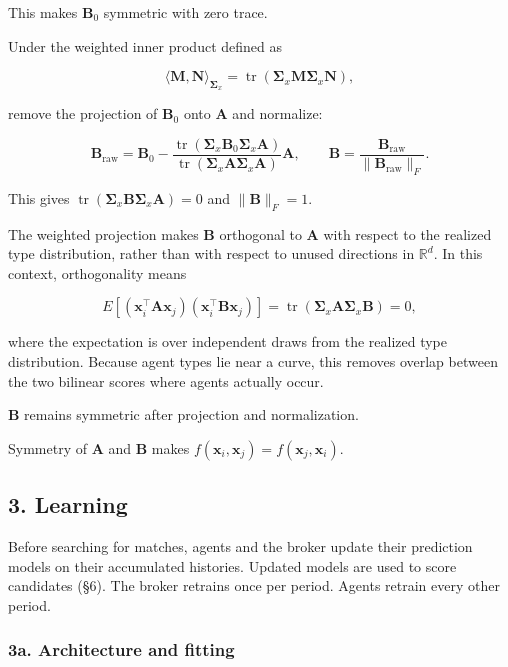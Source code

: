 \documentclass[11pt]{article}
\begin{document}
This makes \(\mathbf{B}_0\) symmetric with zero trace.

Under the weighted inner product defined as

\[\langle \mathbf{M}, \mathbf{N} \rangle_{\boldsymbol{\Sigma}_x} = \operatorname{tr}(\boldsymbol{\Sigma}_x \mathbf{M} \boldsymbol{\Sigma}_x \mathbf{N}),\]

remove the projection of \(\mathbf{B}_0\) onto \(\mathbf{A}\) and normalize:

\[\mathbf{B}_{\text{raw}} = \mathbf{B}_0 - \frac{\operatorname{tr}(\boldsymbol{\Sigma}_x \mathbf{B}_0 \boldsymbol{\Sigma}_x \mathbf{A})}{\operatorname{tr}(\boldsymbol{\Sigma}_x \mathbf{A} \boldsymbol{\Sigma}_x \mathbf{A})} \mathbf{A}, \qquad \mathbf{B} = \frac{\mathbf{B}_{\text{raw}}}{\lVert \mathbf{B}_{\text{raw}} \rVert_F}.\]

This gives \(\operatorname{tr}(\boldsymbol{\Sigma}_x\mathbf{B}\boldsymbol{\Sigma}_x\mathbf{A})=0\) and \(\|\mathbf{B}\|_F=1\).

The weighted projection makes \(\mathbf{B}\) orthogonal to \(\mathbf{A}\) with respect to the realized type distribution, rather than with respect to unused directions in \(\mathbb{R}^d\). In this context, orthogonality means

\[E\!\left[(\mathbf{x}_i^\top\mathbf{A}\mathbf{x}_j)(\mathbf{x}_i^\top\mathbf{B}\mathbf{x}_j)\right] = \operatorname{tr}(\boldsymbol{\Sigma}_x\mathbf{A}\boldsymbol{\Sigma}_x\mathbf{B}) = 0,\]

where the expectation is over independent draws from the realized type distribution. Because agent types lie near a curve, this removes overlap between the two bilinear scores where agents actually occur.

\(\mathbf{B}\) remains symmetric after projection and normalization.

Symmetry of \(\mathbf{A}\) and \(\mathbf{B}\) makes \(f(\mathbf{x}_i,\mathbf{x}_j)=f(\mathbf{x}_j,\mathbf{x}_i)\).

\subsection{3. Learning}\label{learning}

Before searching for matches, agents and the broker update their prediction models on their accumulated histories. Updated models are used to score candidates (§6). The broker retrains once per period. Agents retrain every other period.

\subsubsection{3a. Architecture and fitting}\label{a.-architecture-and-fitting}
\end{document}
